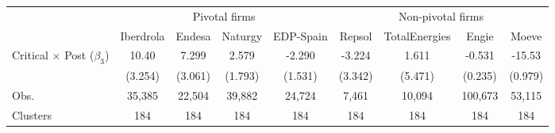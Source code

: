 \begin{tabular}{l c c c c c c c c}
\toprule
 & \multicolumn{4}{c}{Pivotal firms} & \multicolumn{4}{c}{Non-pivotal firms} \\
\cmidrule(lr){2-5} \cmidrule(lr){6-9}
 & Iberdrola & Endesa & Naturgy & EDP-Spain & Repsol & TotalEnergies & Engie & Moeve \\
\midrule

Critical $\times$ Post ($\beta_3$)&       10.40\sym{**} &       7.299\sym{*}  &       2.579         &      -2.290         &      -3.224         &       1.611         &      -0.531\sym{*}  &      -15.53\sym{***}\\
                    &     (3.254)         &     (3.061)         &     (1.793)         &     (1.531)         &     (3.342)         &     (5.471)         &     (0.235)         &     (0.979)         \\
\midrule
Obs.                &      35,385         &      22,504         &      39,882         &      24,724         &       7,461         &      10,094         &     100,673         &      53,115         \\
Clusters            &         184         &         184         &         184         &         184         &         184         &         184         &         184         &         184         \\
\bottomrule
\end{tabular}
